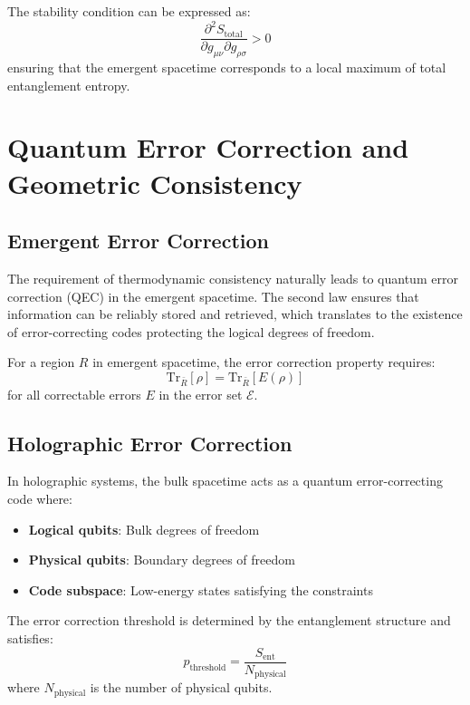 \documentclass[twocolumn,showpacs,preprintnumbers,amsmath,amssymb,aps]{revtex4-1}
\begin{document}
The stability condition can be expressed as:
\begin{equation}
\frac{\partial^2 S_{\text{total}}}{\partial g_{\mu\nu} \partial g_{\rho\sigma}} > 0
\label{eq:stability_condition}
\end{equation}
ensuring that the emergent spacetime corresponds to a local maximum of total entanglement entropy.

\section{Quantum Error Correction and Geometric Consistency}

\subsection{Emergent Error Correction}

The requirement of thermodynamic consistency naturally leads to quantum error correction (QEC) in the emergent spacetime. The second law ensures that information can be reliably stored and retrieved, which translates to the existence of error-correcting codes protecting the logical degrees of freedom.

For a region $R$ in emergent spacetime, the error correction property requires:
\begin{equation}
\text{Tr}_{\bar{R}}[\rho] = \text{Tr}_{\bar{R}}[E(\rho)]
\label{eq:error_correction}
\end{equation}
for all correctable errors $E$ in the error set $\mathcal{E}$.

\subsection{Holographic Error Correction}

In holographic systems, the bulk spacetime acts as a quantum error-correcting code where:
\begin{itemize}
\item \textbf{Logical qubits}: Bulk degrees of freedom
\item \textbf{Physical qubits}: Boundary degrees of freedom  
\item \textbf{Code subspace}: Low-energy states satisfying the constraints
\end{itemize}

The error correction threshold is determined by the entanglement structure and satisfies:
\begin{equation}
p_{\text{threshold}} = \frac{S_{\text{ent}}}{N_{\text{physical}}}
\label{eq:threshold}
\end{equation}
where $N_{\text{physical}}$ is the number of physical qubits.
\end{document}
